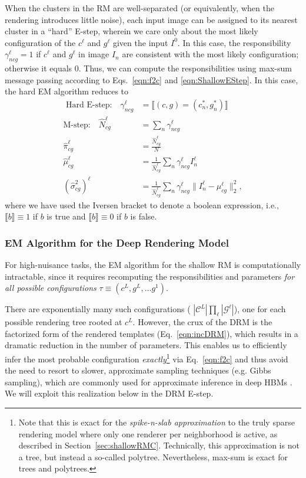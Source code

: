 \documentclass[12pt]{article}
\newcommand{\Cl}[0]{{ \mathcal{C} }}
\newcommand{\G}[0]{{ \mathcal{G} }}
\begin{document}
When the clusters in the RM are well-separated (or equivalently, when the rendering introduces little noise), each input image can be assigned to its nearest cluster in a ``hard'' E-step, wherein we care only about the most likely configuration of the $c^\ell$ and $g^\ell$ given the input $I^0$. In this case, the responsibility $\gamma_{ncg}^\ell = 1$ if $c^\ell$ and $g^\ell$ in image $I_{n}$ are consistent with the most likely configuration; otherwise it equals 0. Thus, we can compute the responsibilities using max-sum message passing according to Eqs.~\ref{eqn:f2c} and \ref{eqn:ShallowEStep}.  
In this case, the hard EM algorithm reduces to 
\begin{align} 
   \textrm{ Hard E-step:} \quad \gamma_{ncg}^\ell &= \llbracket (c,g) = (c^*_n,g^*_n) \rrbracket \\[3mm]
    \textrm{M-step:} \quad \hat{N}_{cg}^\ell &= \sum_n \gamma_{ncg}^\ell \nonumber\\
    \hat{\pi}_{cg}^\ell &= \frac{\hat{N}_{cg}^\ell }{N} \nonumber\\
    \hat{\mu}_{cg}^\ell &= \frac{1}{\hat{N}_{cg}^\ell} \sum_n \gamma_{ncg}^\ell I_n^\ell \nonumber\\
    (\hat{\sigma}_{cg}^2)^\ell &= \frac{1}{\hat{N}_{cg}^\ell} \sum_n \gamma_{ncg}^\ell \| I_n^\ell - \mu_{cg}^\ell \|_2^2,
\end{align}
where we have used the Iversen bracket to denote a boolean expression, i.e., $\llbracket b \rrbracket \equiv 1$ if $b$ is true and $\llbracket b \rrbracket \equiv 0$ if $b$ is false.

\subsubsection{EM Algorithm for the Deep Rendering Model}
\label{sec:EM-DRM}

For high-nuisance tasks, the EM algorithm for the shallow RM is computationally intractable, since it requires recomputing the responsibilities and parameters \emph{for all possible configurations} $\tau \equiv ( c^{L}, g^{L},\ldots g^{1})$. 

There are exponentially many such configurations ( $|\Cl^L |\prod_{\ell} |\G^{\ell}|$), one for each possible rendering tree rooted at $c^{L}$. However, the crux of the DRM is the factorized form of the rendered templates (Eq.~\ref{eqn:incDRM}), which results in a dramatic reduction in the number of parameters. This enables us to efficiently infer the most probable configuration \emph{exactly}\footnote{Note that this is exact for the {\em spike-n-slab approximation} to the truly sparse rendering model where only one renderer per neighborhood is active, as described in Section~\ref{sec:shallowRMC}. Technically, this approximation is not a tree, but instead a so-called polytree. Nevertheless, max-sum is exact for trees and polytrees\cite{vamos1992judea}. } via Eq.~\ref{eqn:f2c} and thus avoid the need to resort to slower, approximate sampling techniques (e.g. Gibbs sampling), which are commonly used for approximate inference in deep HBMs \cite{tang2012deep, van2014factoring}. We will exploit this realization below in the DRM E-step.
\end{document}
